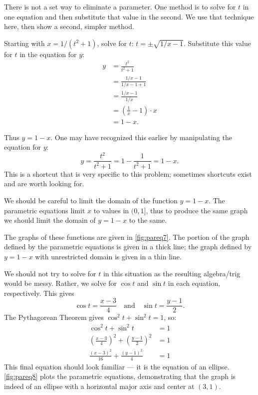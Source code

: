 {There is not a set way to eliminate a parameter. One method is to solve for $t$ in one equation and then substitute that value in the second. We use that technique here, then show a second, simpler method.

Starting with $x= 1/(t^2+1)$, solve for $t$: $ t = \pm\sqrt{1/x-1}$. Substitute this value for $t$ in the equation for $y$:
\begin{align*}
 y &= \frac{t^2}{t^2 +1} \\
		&= \frac{1/x-1}{1/x-1+1} \\
		&= \frac{1/x - 1}{1/x} \\
		&= \left(\frac1x-1\right)\cdot x \\
		&= 1-x.
\end{align*}

Thus $y=1-x$. One may have recognized this earlier by manipulating the equation for $y$:
$$y = \frac{t^2}{t^2+1} = 1-\frac{1}{t^2+1} = 1-x.$$ This is a shortcut that is very specific to this problem; sometimes shortcuts exist and are worth looking for.

We should be careful to limit the domain of the function $y=1-x$. The parametric equations limit $x$ to values in $(0,1]$, thus to produce the same graph we should limit the domain of $y=1-x$ to the same. 

The graphs of these functions are given in \autoref{fig:pareq7}. The portion of the graph defined by the parametric equations is given in a thick line; the graph defined by $y=1-x$ with unrestricted domain is given in a thin line.}

{We should not try to solve for $t$ in this situation as the resulting algebra/trig would be messy. Rather, we solve for $\cos t$ and $\sin t$ in each equation, respectively. This gives
$$\cos t = \frac{x-3}{4} \quad \text{and}\quad \sin t=\frac{y-1}{2}.$$
The Pythagorean Theorem gives $\cos^2t+\sin^2t=1$, so:
\begin{align*}
\cos^2t+\sin^2t &=1 \\
\left(\frac{x-3}{4}\right)^2 +\left(\frac{y-1}{2}\right)^2 &=1\\
\frac{(x-3)^2}{16}+\frac{(y-1)^2}{4} &=1
\end{align*}
This final equation should look familiar --- it is the equation of an ellipse. \autoref{fig:pareq8} plots the parametric equations, demonstrating that the graph is indeed of an ellipse with a horizontal major axis and center at $(3,1)$.}

